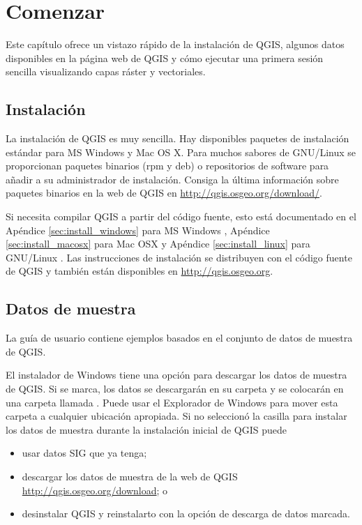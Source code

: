 
\section{Comenzar}\label{label_getstarted}


Este capítulo ofrece un vistazo rápido de la instalación de QGIS, algunos datos disponibles 
en la página web de QGIS y cómo ejecutar una primera sesión sencilla
visualizando capas ráster y vectoriales.

\subsection{Instalación}\label{label_installation}

La instalación de QGIS es muy sencilla. Hay disponibles paquetes de instalación estándar
para MS Windows y Mac OS X. Para muchos sabores de GNU/Linux se proporcionan paquetes
binarios (rpm y deb) o repositorios de software para añadir a su administrador
de instalación. Consiga la última información sobre paquetes binarios en la web de
QGIS en \url{http://qgis.osgeo.org/download/}.

Si necesita compilar QGIS a partir del código fuente, esto está documentado en el Apéndice
\ref{sec:install_windows} para MS Windows \win, Apéndice
\ref{sec:install_macosx} para Mac OSX \osx y Apéndice
\ref{sec:install_linux} para GNU/Linux \nix. Las instrucciones de instalación se
distribuyen con el código fuente de QGIS y también están disponibles en
\url{http://qgis.osgeo.org}.

\subsection{Datos de muestra}\label{label_sampledata}

La guía de usuario contiene ejemplos basados en el conjunto de datos
de muestra de QGIS.

\win El instalador de Windows tiene una opción para descargar los datos de muestra de QGIS.
Si se marca, los datos se descargarán en su carpeta 
y se colocarán en una carpeta llamada . 
Puede usar el Explorador de Windows para mover esta carpeta a cualquier ubicación apropiada.
Si no seleccionó la casilla para instalar los datos de muestra
durante la instalación inicial de QGIS puede
\begin{itemize}
\item usar datos SIG que ya tenga;
\item descargar los datos de muestra de la web de QGIS
 \url{http://qgis.osgeo.org/download}; o
\item desinstalar QGIS y reinstalarto con la opción de descarga de datos marcada.
\end{itemize}

